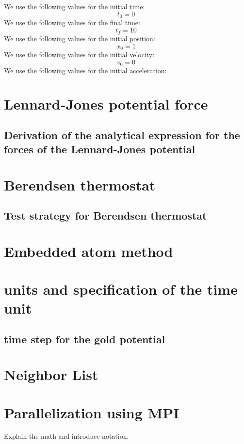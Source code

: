 We use the following values for the initial time:
\begin{equation}
    t_0 = 0
\end{equation}
We use the following values for the final time:
\begin{equation}
    t_f = 10
\end{equation}
We use the following values for the initial position:
\begin{equation}
    x_0 = 1
\end{equation}
We use the following values for the initial velocity:
\begin{equation}
    v_0 = 0
\end{equation}
We use the following values for the initial acceleration:

\section{Lennard-Jones potential force}
\subsection{Derivation of the analytical expression for the forces of the Lennard-Jones potential}

\section{Berendsen thermostat}
\subsection{Test strategy for Berendsen thermostat}

\section{Embedded atom method}
\section{units and specification of the time unit}
\subsection{time step for the gold potential}


\section{Neighbor List}

\section{Parallelization using MPI}

Explain the math and introduce notation.

